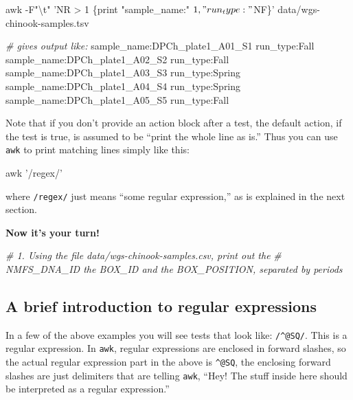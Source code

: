 \documentclass[]{krantz}
\makeatletter
\newenvironment{Shaded}{\begin{snugshade}}{\end{snugshade}}
\newcommand{\CommentTok}[1]{\textcolor[rgb]{0.37,0.37,0.37}{\textit{#1}}}
\newcommand{\ExtensionTok}[1]{#1}
\newcommand{\FunctionTok}[1]{\textcolor[rgb]{0,0,0}{#1}}
\newcommand{\NormalTok}[1]{#1}
\newcommand{\StringTok}[1]{\textcolor[rgb]{0.5,0.5,0.5}{#1}}
\newenvironment{kframe}{%
\medskip{}
\setlength{\fboxsep}{.8em}
 \def\at@end@of@kframe{}%
 \ifinner\ifhmode%
  \def\at@end@of@kframe{\end{minipage}}%
  \begin{minipage}{\columnwidth}%
 \fi\fi%
 \def\FrameCommand##1{\hskip\@totalleftmargin \hskip-\fboxsep
 \colorbox{shadecolor}{##1}\hskip-\fboxsep
     \hskip-\linewidth \hskip-\@totalleftmargin \hskip\columnwidth}%
 \MakeFramed {\advance\hsize-\width
   \@totalleftmargin\z@ \linewidth\hsize
   \@setminipage}}%
 {\par\unskip\endMakeFramed%
 \at@end@of@kframe}
\renewenvironment{Shaded}{\begin{kframe}}{\end{kframe}}
\makeatother
\begin{document}
\begin{Shaded}
\begin{Highlighting}[]
\FunctionTok{awk}\NormalTok{ -F}\StringTok{"\textbackslash{}t"} \StringTok{'NR > 1 \{print "sample_name:" $1, "run_type:" $NF\}'}\NormalTok{ data/wgs-chinook-samples.tsv}

\CommentTok{# gives output like:}
\ExtensionTok{sample_name}\NormalTok{:DPCh_plate1_A01_S1 run_type:Fall}
\ExtensionTok{sample_name}\NormalTok{:DPCh_plate1_A02_S2 run_type:Fall}
\ExtensionTok{sample_name}\NormalTok{:DPCh_plate1_A03_S3 run_type:Spring}
\ExtensionTok{sample_name}\NormalTok{:DPCh_plate1_A04_S4 run_type:Spring}
\ExtensionTok{sample_name}\NormalTok{:DPCh_plate1_A05_S5 run_type:Fall}
\end{Highlighting}
\end{Shaded}

Note that if you don't provide an action block after a test, the default action, if the
test is true, is assumed to be ``print the whole line as is.'' Thus you can use \texttt{awk} to
print matching lines simply like this:

\begin{Shaded}
\begin{Highlighting}[]
\FunctionTok{awk} \StringTok{'/regex/'}
\end{Highlighting}
\end{Shaded}

where \texttt{/regex/} just means ``some regular expression,'' as is explained in the
next section.

\textbf{Now it's your turn!}

\begin{Shaded}
\begin{Highlighting}[]
\CommentTok{# 1. Using the file data/wgs-chinook-samples.csv, print out the}
\CommentTok{# NMFS_DNA_ID the BOX_ID and the BOX_POSITION, separated by periods}

\end{Highlighting}
\end{Shaded}

\hypertarget{a-brief-introduction-to-regular-expressions}{%
\subsection{A brief introduction to regular expressions}\label{a-brief-introduction-to-regular-expressions}}

In a few of the above examples you will see tests that look like: \texttt{/\^{}@SQ/}. This is a regular expression. In
\texttt{awk}, regular expressions are enclosed in forward slashes, so the actual regular expression part
in the above is \texttt{\^{}@SQ}, the enclosing forward slashes are just delimiters that are telling \texttt{awk}, ``Hey! The stuff inside here should
be interpreted as a regular expression.''
\end{document}
